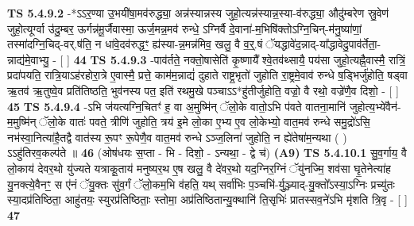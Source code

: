 \documentclass[17pt]{extarticle}
\begin{document}
                                \textbf{ TS 5.4.9.2} \newline
                  -*ऽऽर॒ण्या उ॒भयी॑षा॒मव॑रुद्ध्या॒ अन्न॑स्यान्नस्य जुहो॒त्यन्न॑स्यान्न॒स्या-व॑रुद्ध्या॒ औदु॑म्बरेण स्रु॒वेण॑ जुहो॒त्यूर्ग्वा उ॑दु॒म्बर॒ ऊर्गन्न॑मू॒र्जैवास्मा॒ ऊर्ज॒मन्न॒मव॑ रुन्धे॒ ऽग्निर्वै दे॒वाना॑-म॒भिषि॑क्तोऽग्नि॒चिन्-म॑नु॒ष्या॑णां॒ तस्मा॑दग्नि॒चिद्-वर्.ष॑ति॒ न धा॑वे॒दव॑रुद्धꣳ॒॒ ह्य॑स्या-न्न॒मन्न॑मिव॒ खलु॒ वै व॒र्॒.षं ॅयद्धावे॑द॒न्नाद्-या᳚द्धावेदु॒पाव॑र्तेता॒-न्नाद्य॑मे॒वाभ्यु॒ - [  ] \textbf{  44} \newline
                  \newline
                                \textbf{ TS 5.4.9.3} \newline
                  -पाव॑र्तते॒ नक्तो॒षासेति॑ कृ॒ष्णायै᳚ श्वे॒तव॑थ्सायै॒ पय॑सा जुहो॒त्यह्नै॒वास्मै॒ रात्रिं॒ प्रदा॑पयति॒ रात्रि॒याऽह॑रहोरा॒त्रे ए॒वास्मै॒ प्रत्ते॒ काम॑म॒न्नाद्यं॑ दुहाते राष्ट्र॒भृतो॑ जुहोति रा॒ष्ट्रमे॒वाव॑ रुन्धे ष॒ड्भिर्जु॑होति॒ षड्वा ऋ॒तव॑ ऋ॒तुष्वे॒व प्रति॑तिष्ठति॒ भुव॑नस्य पत॒ इति॑ रथमु॒खे पञ्चाऽऽ*हु॑तीर्जुहोति॒ वज्रो॒ वै रथो॒ वज्रे॑णै॒व दिशो॒ - [  ] \textbf{  45} \newline
                  \newline
                                \textbf{ TS 5.4.9.4} \newline
                  -ऽभि ज॑यत्यग्नि॒चितꣳ॑ ह॒ वा अ॒मुष्मि॑न् ॅलो॒के वातो॒ऽभि प॑वते वातना॒मानि॑ जुहोत्य॒भ्ये॑वैन॑-म॒मुष्मि॑न् ॅलो॒के वातः॑ पवते॒ त्रीणि॑ जुहोति॒ त्रय॑ इ॒मे लो॒का ए॒भ्य ए॒व लो॒केभ्यो॒ वात॒मव॑ रुन्धे समु॒द्रो॑ऽसि॒ नभ॑स्वा॒नित्या॑है॒तद्वै वात॑स्य रू॒पꣳ रू॒पेणै॒व वात॒मव॑ रुन्धे ऽञ्ज॒लिना॑ जुहोति॒ न ह्ये॑तेषा॑म॒न्यथा ( ) ऽऽहु॑तिरव॒कल्प॑ते ॥ \textbf{  46} \newline
                  \newline
                      (ओष॑धयः स॒प्ता - भि - दिशो॒ - ऽन्यथा॒ - द्वे च॑)  \textbf{(A9)} \newline \newline
                                        \textbf{ TS 5.4.10.1} \newline
                  सु॒व॒र्गाय॒ वै लो॒काय॑ देवर॒थो यु॑ज्यते यत्राकू॒ताय॑ मनुष्यर॒थ ए॒ष खलु॒ वै दे॑वर॒थो यद॒ग्निर॒ग्निं ॅयु॑नज्मि॒ शव॑सा घृ॒तेनेत्या॑ह यु॒नक्त्ये॒वैनꣳ॒॒ स ए॑नं ॅयु॒क्तः सु॑व॒र्गं ॅलो॒कम॒भि व॑हति॒ यथ् सर्वा॑भिः प॒ञ्चभि॑-र्यु॒ञ्ज्याद्-यु॒क्तो᳚ऽस्या॒ऽग्निः प्रच्यु॑तः स्या॒दप्र॑तिष्ठिता॒ आहु॑तयः॒ स्युरप्र॑तिष्ठिताः॒ स्तोमा॒ अप्र॑तिष्ठितान्यु॒क्थानि॑ ति॒सृभिः॑ प्रातस्सव॒ने॑ऽभि मृ॑शति त्रि॒वृ - [  ] \textbf{  47} \newline
                  \newline
\end{document}
